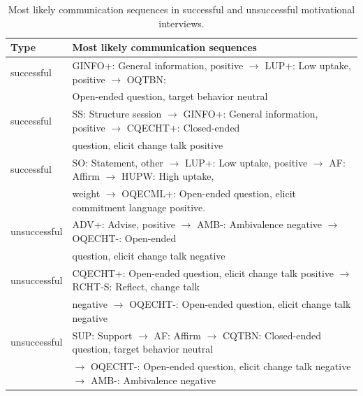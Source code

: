 \documentclass{amia_summit_2018}
\begin{document}
\begin{table}[ht]
\centering
\caption{Most likely communication sequences in successful and unsuccessful motivational interviews.}
\label{tab:common_patterns}
  \begin{tabular}{|l|l|}
  \hline
   \textbf{Type} & \textbf{Most likely communication sequences} \\ \hline      
successful & GINFO+: General information, positive $\rightarrow $ LUP+: Low uptake, positive $\rightarrow $ OQTBN: \\ 
& Open-ended question, target behavior neutral \\\hline
successful & SS: Structure session $\rightarrow $ GINFO+: General information, positive $\rightarrow $ CQECHT+: Closed-ended \\
& question, elicit change talk positive\\\hline
successful & SO: Statement, other $\rightarrow $ LUP+: Low uptake, positive $\rightarrow $ AF: Affirm $\rightarrow $ HUPW: High uptake, \\
& weight $\rightarrow $ OQECML+: Open-ended question, elicit commitment language positive. \\\hline
unsuccessful & ADV+: Advise, positive $\rightarrow $ AMB-: Ambivalence negative $\rightarrow $ OQECHT-: Open-ended \\
& question, elicit change talk negative\\\hline
unsuccessful & CQECHT+: Open-ended question, elicit change talk positive $\rightarrow $ RCHT-S: Reflect, change talk \\
& negative $\rightarrow $ OQECHT-: Open-ended question, elicit change talk negative \\\hline
unsuccessful & SUP: Support $\rightarrow $ AF: Affirm $\rightarrow $ CQTBN: Closed-ended question, target behavior neutral \\
& $\rightarrow $ OQECHT-: Open-ended question, elicit change talk negative $\rightarrow $ AMB-: Ambivalence negative\\\hline
  \end{tabular}
\end{table} 
\end{document}
